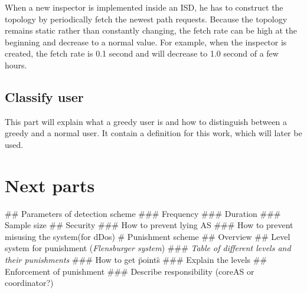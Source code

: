 \documentclass[thesis.tex]{subfiles}
\begin{document}
When a new inspector is implemented inside an ISD, he has to construct the topology by periodically fetch the newest path requests. Because the topology remains static rather than constantly changing, the fetch rate can be high at the beginning and decrease to a normal value. For example, when the inspector is created, the fetch rate is 0.1 second and will decrease to 1.0 second of a few hours. 


\subsection{Classify user}
This part will explain what a greedy user is and how to distinguish between a greedy and a normal user. It contain a definition for this work, which will later be used.


\section{Next parts}
\begin{easylist}
    \MyListProperties
        ## Parameters of detection scheme
        ### Frequency
        ### Duration
        ### Sample size
        ## Security
        ### How to prevent lying AS
        ### How to prevent misusing the system(for dDos)
        # Punishment scheme
        ## Overview
        ## Level system for punishment (\textit{Flensburger system})
        ### \textit{Table of different levels and their punishments}
        ### How to get \"points\"
        ### Explain the levels
        ## Enforcement of punishment
        ### Describe responsibility (coreAS or coordinator?)
    \end{easylist}
\subfilebib %
\end{document}
